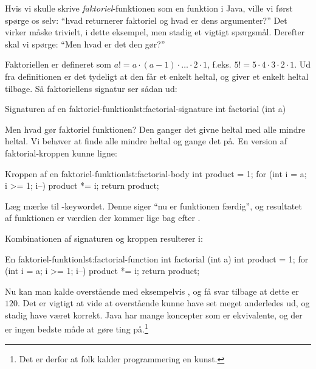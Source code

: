 		Hvis vi skulle skrive \emph{faktoriel}-funktionen som en funktion i Java,
		ville vi først spørge os selv: ``hvad returnerer faktoriel og hvad er dens
		argumenter?'' Det virker måske trivielt, i dette eksempel, men stadig et
		vigtigt spørgsmål. Derefter skal vi spørge: ``Men hvad er det den gør?''

		Faktoriellen er defineret som \(a! = a \cdot (a-1) \cdot \dots \cdot 2 \cdot 1\),
		f.eks. \(5! = 5 \cdot 4 \cdot 3 \cdot 2 \cdot 1\). Ud fra definitionen er det
		tydeligt at den får et enkelt heltal, og giver et enkelt heltal tilbage. Så
		faktoriellens signatur ser sådan ud:

		\begin{JavaCode}{Signaturen af en faktoriel-funktion}{lst:factorial-signature}
			int factorial (int a)
		\end{JavaCode}

		Men hvad gør faktoriel funktionen? Den ganger det givne heltal med alle mindre
		heltal. Vi behøver at finde alle mindre heltal og gange det på. En version
		af faktorial-kroppen kunne ligne:

		\begin{JavaCode}{Kroppen af en faktoriel-funktion}{lst:factorial-body}
			int product = 1;
			for (int i = a; i >= 1; i--)
				product *= i;
			return product;
		\end{JavaCode}

        Læg mærke til -keywordet. Denne siger ``nu
        er funktionen færdig'', og resultatet af funktionen er værdien
        der kommer lige bag efter .

		Kombinationen af signaturen og kroppen resulterer i:

		\begin{JavaCode}{En faktoriel-funktion}{lst:factorial-function}
			int factorial (int a) {
				int product = 1;
				for (int i = a; i >= 1; i--)
					product *= i;
				return product;
			}
		\end{JavaCode}

        Nu kan man kalde overstående med eksempelvis
        , og få svar tilbage at dette er
        \(120\). Det er vigtigt at vide at overstående kunne have set
        meget anderledes ud, og stadig have været korrekt. Java har
        mange koncepter som er ekvivalente, og der er ingen bedste
        måde at gøre ting på.\footnote{Det er derfor at folk kalder
        programmering en kunst.}


